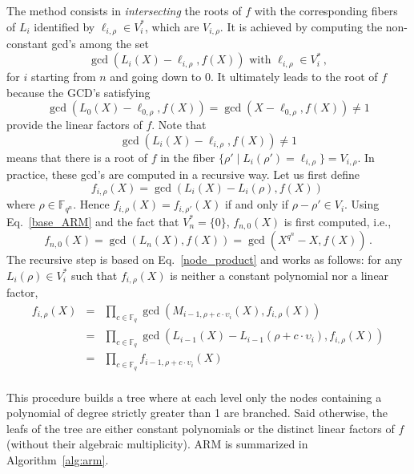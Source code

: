 \documentclass{sig-alternate}
\newcommand{\ff}[1]{\mathbb{F}_{#1}}
\newcommand{\qq}{q}
\newcommand{\nn}{n}
\newcommand{\qn}{{\qq^\nn}}
\newcommand{\basef}{\ff{\qq}}
\newcommand{\extf}{\ff{\qn}}
\renewcommand{\paragraph}[1]{\smallskip\noindent{{\bf \rm #1.}}}
\begin{document}
\paragraph{ARM} The method consists in \emph{intersecting} the roots of $f$ with the corresponding fibers of $L_i$ identified by $\ell_{i,\rho} \in V_i^\ast$, which are $V_{i,\rho}$.
 It is achieved by computing the non-constant gcd's among the set
 \begin{equation}
 \label{base_ARM}
\gcd(L_i(X)-\ell_{i,\rho},f(X))     \mbox{ with }  \ell_{i,\rho}  \in V_i^\ast\,,
\end{equation}
for $i$ starting from $n$ and going down to 0.
It ultimately leads to the root of $f$ because the GCD's satisfying
$$\gcd(L_0(X)-\ell_{0,\rho},f(X))=\gcd(X-\ell_{0,\rho},f(X)) \ne 1$$ 
provide the linear factors of $f$. 
Note that 
\begin{equation}
  \label{eq:duality-gcd}
  \gcd(L_i(X)-\ell_{i,\rho},f(X)) \ne 1
\end{equation}
means that there is a root of $f$ in the fiber $\{\rho' \mid L_i(\rho')=\ell_{i,\rho} \}=V_{i,\rho}$.
In practice, these gcd's are computed in a recursive way. Let us first define
 $$f_{i,\rho}(X)=\gcd(L_i(X)-L_i(\rho),f(X))\,$$
where $\rho \in \extf$. Hence $f_{i,\rho}(X)=f_{i,\rho'}(X)$ if and only if $\rho-\rho' \in V_i$.
Using Eq.~\eqref{base_ARM} and the fact that $V_n^\ast=\{0\}$, $f_{n,0}(X)$ is first computed, i.e.,
 $$f_{n,0}(X)=\gcd(L_n(X),f(X))=\gcd(X^{q^\nn}-X,f(X))\,.$$
The recursive step is based on Eq.~\eqref{node_product} and works as follows: for any $L_i(\rho) \in V_i^\ast$ such that $f_{i,\rho}(X)$ is neither a constant polynomial nor a linear factor,
  $$
  \begin{array}{lll}
  f_{i,\rho}(X)&=&\prod_{c \in \basef} \gcd(M_{i-1,\rho+c \cdot \upsilon_i}(X),f_{i,\rho}(X)) \\
               &=&\prod_{c \in \basef} \gcd(L_{i-1}(X)-L_{i-1}(\rho+c \cdot \upsilon_i),f_{i,\rho}(X)) \\
               &=&\prod_{c \in \basef} f_{i-1,\rho+c \cdot  \upsilon_i}(X)\\
  \end{array}              
  $$ 
 
 This procedure builds a tree where at each level only the nodes containing a polynomial of degree strictly greater than 1 are branched. Said otherwise, the leafs of the tree are either constant polynomials or the distinct linear factors of $f$ (without their algebraic multiplicity). ARM is summarized in Algorithm~\ref{alg:arm}.
\end{document}
